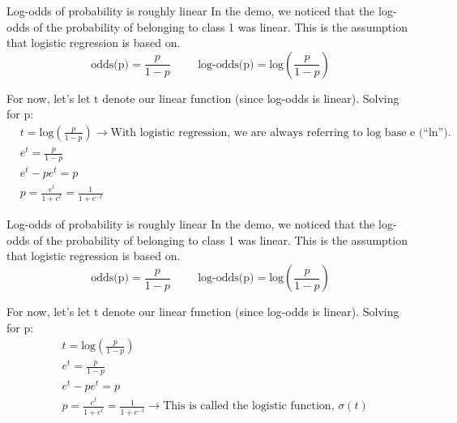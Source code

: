 \documentclass[aspectratio=169]{../latex_main/tntbeamer}  %
\begin{document}
	
	\begin{frame}{Log-odds of probability is roughly linear}
	    In the demo, we noticed that the log-odds of the probability of belonging to class 1 was linear. This is the assumption that logistic regression is based on. \\
	    \begin{equation*}
	        \text{odds(p)} = \frac{p}{1 - p}\hspace{1cm} \text{log-odds(p)} = \text{log}\left(\frac{p}{1 - p}\right)
	    \end{equation*}
	    
	    For now, let’s let t denote our linear function (since log-odds is linear). Solving for p:
	    \begin{align*}
	        &t = \text{log}\left(\frac{p}{1 - p}\right)\rightarrow \text{With logistic regression, we are always referring to log base e (“ln”).
} \\
	        &e^t = \frac{p}{1 - p}\\
	        &e^t - pe^t = p\\
	        &p = \frac{e^t}{1 + e^t} = \frac{1}{1 + e^{-t}}
	    \end{align*}
	\end{frame}
	
	\begin{frame}{Log-odds of probability is roughly linear}
	    In the demo, we noticed that the log-odds of the probability of belonging to class 1 was linear. This is the assumption that logistic regression is based on. \\
	    \begin{equation*}
	        \text{odds(p)} = \frac{p}{1 - p}\hspace{1cm} \text{log-odds(p)} = \text{log}\left(\frac{p}{1 - p}\right)
	    \end{equation*}
	    
	    For now, let’s let t denote our linear function (since log-odds is linear). Solving for p:
	    \begin{align*}
	        &t = \text{log}\left(\frac{p}{1 - p}\right)\\
	        &e^t = \frac{p}{1 - p}\\
	        &e^t - pe^t = p\\
	        &p = \frac{e^t}{1 + e^t} = \frac{1}{1 + e^{-t}} \rightarrow \text{This is called the logistic function, } \sigma (t)
	    \end{align*}
	\end{frame}
	
\end{document}
